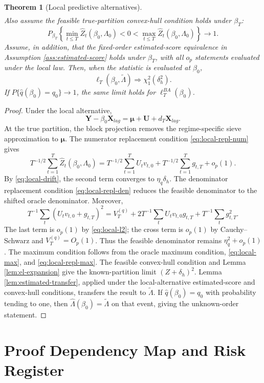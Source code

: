 \documentclass[12pt]{article}
\numberwithin{equation}{section}
\newtheorem{theorem}{Theorem}
\theoremstyle{definition}
\begin{document}
\begin{theorem}[Local predictive alternatives]
\begin{align}
\end{align}
Also assume the feasible true-partition convex-hull condition holds under \(\beta_T\):
\[
    P_{\beta_T}\left\{
    \min_{t\leq T}\widehat Z_t(\beta_0,\Lambda_0)<0<
    \max_{t\leq T}\widehat Z_t(\beta_0,\Lambda_0)
    \right\}\to1.
\]
Assume, in addition, that the fixed-order estimated-score equivalence in Assumption \ref{ass:estimated-score} holds under \(\beta_T\), with all \(o_p\) statements evaluated under the local law. Then, when the statistic is evaluated at \(\beta_0\),
\[
    \ell_T(\beta_0,\widetilde\Lambda)
    \Rightarrow
    \chi_1^2(\delta_h^2).
\]
If \(P\{\widehat q(\beta_0)=q_0\}\to1\), the same limit holds for \(\ell_T^{BA}(\beta_0)\).
\end{theorem}

\begin{proof}
Under the local alternative,
\[
    \bm Y-\beta_0\bm X_{lag}
    =
    \bm\mu+\bm U+d_T\bm X_{lag}.
\]
At the true partition, the block projection removes the regime-specific sieve approximation to \(\bm\mu\). The numerator replacement condition \eqref{eq:local-repl-num} gives
\[
    T^{-1/2}\sum_{t=1}^T \widehat Z_t(\beta_0,\Lambda_0)
    =
    T^{-1/2}\sum_{t=1}^T U_tv_{t,0}
    +
    T^{-1/2}\sum_{t=1}^Tg_{t,T}
    +o_p(1).
\]
By \eqref{eq:local-drift}, the second term converges to \(\eta_q\delta_h\). The denominator replacement condition \eqref{eq:local-repl-den} reduces the feasible denominator to the shifted oracle denominator. Moreover,
\[
    T^{-1}\sum_t(U_tv_{t,0}+g_{t,T})^2
    =
    V_T^{(q)}
    +
    2T^{-1}\sum_tU_tv_{t,0}g_{t,T}
    +
    T^{-1}\sum_tg_{t,T}^2.
\]
The last term is \(o_p(1)\) by \eqref{eq:local-l2}; the cross term is \(o_p(1)\) by Cauchy--Schwarz and \(V_T^{(q)}=O_p(1)\). Thus the feasible denominator remains \(\eta_q^2+o_p(1)\). The maximum condition follows from the oracle maximum condition, \eqref{eq:local-max}, and \eqref{eq:local-repl-max}. The feasible convex-hull condition and Lemma \ref{lem:el-expansion} give the known-partition limit \((Z+\delta_h)^2\). Lemma \ref{lem:estimated-transfer}, applied under the local-alternative estimated-score and convex-hull conditions, transfers the result to \(\widetilde\Lambda\). If \(\widehat q(\beta_0)=q_0\) with probability tending to one, then \(\widehat\Lambda(\beta_0)=\widetilde\Lambda\) on that event, giving the unknown-order statement.
\end{proof}

\section{Proof Dependency Map and Risk Register}
\end{document}

